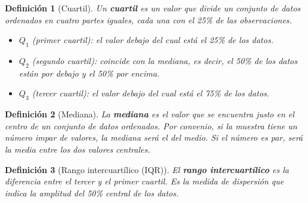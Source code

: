 \documentclass[12pt,a4paper]{book}
\newtheorem{defi}{Definición}[section]
\begin{document}
\begin{defi}[Cuartil]
\label{def:cuartil}
Un \textbf{cuartil} es un valor que divide un conjunto de datos ordenados en cuatro partes iguales, cada una con el 25\% de las observaciones.
\begin{itemize}
    \item $Q_1$ (primer cuartil): el valor debajo del cual está el 25\% de los datos.  
    \item $Q_2$ (segundo cuartil): coincide con la mediana, es decir, el 50\% de los datos están por debajo y el 50\% por encima.  
    \item $Q_3$ (tercer cuartil): el valor debajo del cual está el 75\% de los datos.  
\end{itemize}
\end{defi}

\begin{defi}[Mediana]
\label{def:mediana}
La \textbf{mediana} es el valor que se encuentra justo en el centro de un conjunto de datos ordenados. Por convenio, si la muestra tiene un número impar de valores, la mediana será el del medio. Si el número es par, será la media entre los dos valores centrales.
\end{defi}

\begin{defi}[Rango intercuartílico (IQR)]
\label{def:iqr}
El \textbf{rango intercuartílico} es la diferencia entre el tercer y el primer cuartil. Es la medida de dispersión que indica la amplitud del 50\% central de los datos.
\end{defi}




\nocite{*}


\end{document}
